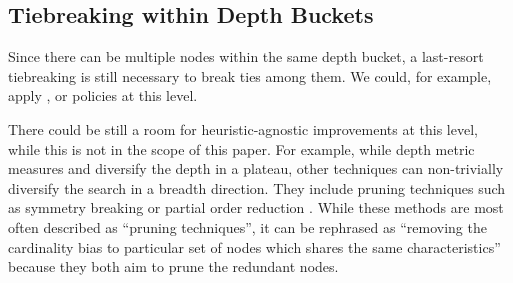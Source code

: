 \subsection{Tiebreaking within Depth Buckets}

Since there can be multiple nodes within the same depth bucket,
a last-resort tiebreaking is still necessary to break ties among them.
We could, for example, apply \lifo, \fifo or \ro policies at this level.

There could be still a room for heuristic-agnostic improvements at
this level, while this is not in the scope of this paper.
For example, while depth metric measures and diversify the depth in a plateau,
other techniques can non-trivially diversify the search in a breadth direction.
They include pruning techniques such as 
symmetry breaking \cite{Fox1998,pochter2011exploiting,domshlak2013symmetry}
or partial order reduction \cite{hall2013faster,wehrle2013relative}.
While these methods are most often described as ``pruning techniques'',
it can be rephrased as ``removing the cardinality bias to particular set
of nodes which shares the same characteristics'' because they both
aim to prune the redundant nodes.






